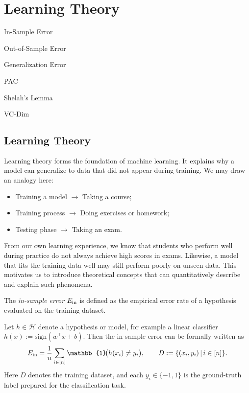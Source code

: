 \documentclass[../main]{subfiles}
\begin{document}
\chapter{Learning Theory}
\begin{introduction}
    \item In-Sample Error
    \item Out-of-Sample Error
    \item Generalization Error
    \item PAC
    \item Shelah's Lemma
    \item VC-Dim
\end{introduction}
\section{Learning Theory}
Learning theory forms the foundation of machine learning. It explains why a model can generalize to data that did not appear during training. We may draw an analogy here:
\begin{itemize}
\item Training a model $\to$ Taking a course;
\item Training process $\to$ Doing exercises or homework;
\item Testing phase $\to$ Taking an exam.
\end{itemize}
From our own learning experience, we know that students who perform well during practice do not always achieve high scores in exams. Likewise, a model that fits the training data well may still perform poorly on unseen data. This motivates us to introduce theoretical concepts that can quantitatively describe and explain such phenomena.

\begin{definition}
    The \emph{in-sample error} $E_{\rm in}$ is defined as the empirical error rate of a hypothesis evaluated on the training dataset.
    \end{definition}
    
    Let $h \in \mathcal{H}$ denote a hypothesis or model, for example a linear classifier $h(x) := \mathrm{sign}(w^\top x + b)$.  
    Then the in-sample error can be formally written as
    \begin{equation}
        E_{\rm in} = \frac{1}{n}\sum_{i \in [n]} \mathbb{1}\!\big(h(x_i) \neq y_i\big),
        \qquad D := \{(x_i, y_i)\,|\, i \in [n]\}.
    \end{equation}
Here $D$ denotes the training dataset, and each $y_i \in \{-1,1\}$ is the ground-truth label prepared for the classification task.
\end{document}

